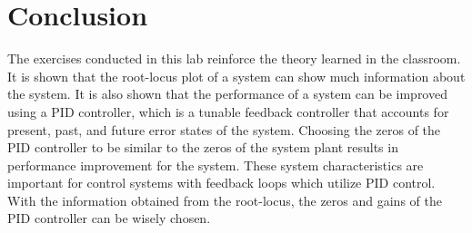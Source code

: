 \documentclass[12pt]{article}
\begin{document}
\section*{\fontsize{12}{12}\selectfont \large Conclusion}
The exercises conducted in this lab reinforce the theory learned in the classroom. It is shown that the root-locus plot of a system can show much information about the system. It is also shown that the performance of a system can be improved using a PID controller, which is a tunable feedback controller that accounts for present, past, and future error states of the system. Choosing the zeros of the PID controller to be similar to the zeros of the system plant results in performance improvement for the system. These system characteristics are important for control systems with feedback loops which utilize PID control. With the information obtained from the root-locus, the zeros and gains of the PID controller can be wisely chosen.




\begin{thebibliography}{2}


\end{thebibliography}




\end{document}
